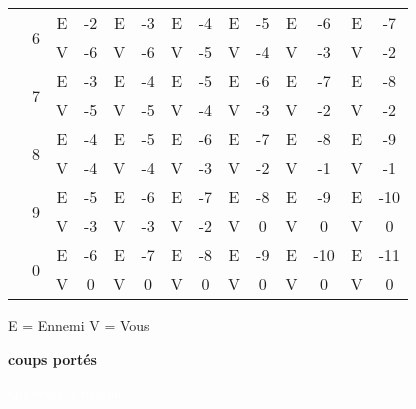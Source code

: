 \documentclass[10pt]{book}
\begin{document}
\begin{minipage}[t]{\textwidth}
\begin{flushright}
{\begin{tabular}{c|c|c c|c c|c c|c c|c c|c c|}
        & \multirow{2}{*}{6}& E&  -2& E&  -3& E&  -4& E&  -5& E&  -6& E&  -7\\
        \cline{3-14}
        & & V&  -6& V&  -6& V&  -5& V&  -4& V&  -3& V&  -2\\
        \cline{2-14}

        & \multirow{2}{*}{7}& E&  -3& E&  -4& E&  -5& E&  -6& E&  -7& E&  -8\\
        \cline{3-14}
        & & V&  -5& V&  -5& V&  -4& V&  -3& V&  -2& V&  -2\\
        \cline{2-14}

        & \multirow{2}{*}{8}& E&  -4& E&  -5& E&  -6& E&  -7& E&  -8& E&  -9\\
        \cline{3-14}
        & & V&  -4& V&  -4& V&  -3& V&  -2& V&  -1& V&  -1\\
        \cline{2-14}

        & \multirow{2}{*}{9}& E&  -5& E&  -6& E&  -7& E&  -8& E&  -9& E& -10\\
        \cline{3-14}
        & & V&  -3& V&  -3& V&  -2& V& 0& V& 0& V& 0\\
        \cline{2-14}

        & \multirow{2}{*}{0}& E&  -6& E&  -7& E&  -8& E&  -9& E& -10& E& -11\\
        \cline{3-14}
        & & V& 0& V& 0& V& 0& V& 0& V& 0& V& 0\\
        \cline{2-14}
    \end{tabular}}
  \end{flushright}
\end{minipage}

\begin{center}
  E = Ennemi \quad\quad V = Vous
\end{center}

\newpage

\begin{flushleft}
  \textbf{\Large coups portés}\\
\end{flushleft}

\textcolor{white}{Quotient d'attaque}\\
\end{document}
